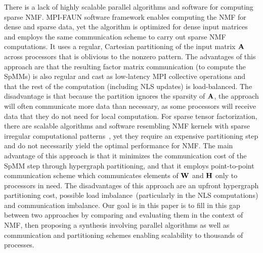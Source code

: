 There is a lack of highly scalable parallel algorithms and software for computing sparse NMF.
MPI-FAUN \cite{KBP17} software framework enables computing the NMF for dense and sparse data, yet the algorithm is optimized for dense input matrices and employs the same communication scheme to carry out sparse NMF computations.
It uses a regular, Cartesian partitioning of the input matrix $\AA$ across processors that is oblivious to the nonzero pattern.
The advantages of this approach are that the resulting factor matrix communication (to compute the SpMMs) is also regular and cast as low-latency MPI collective operations and that the rest of the computation (including NLS updates) is load-balanced.
The disadvantage is that because the partition ignores the sparsity of $\AA$, the approach will often communicate more data than necessary, as some processors will receive data that they do not need for local computation.
For sparse tensor factorization, there are scalable algorithms and software resembling NMF kernels with sparse irregular computational patterns~\cite{KU15}, yet they require an expensive partitioning step and do not necessarily yield the optimal performance for NMF.
The main advantage of this approach is that it minimizes the communication cost of the SpMM step through hypergraph partitioning, and that it employs point-to-point communication scheme which communicates elements of $\WW$ and $\HH$ only to processors in need.
The disadvantages of this approach are an upfront hypergraph partitioning cost, possible load imbalance~(particularly in the NLS computations) and communication imbalance.
Our goal is in this paper is to fill in this gap between two approaches by comparing and evaluating them in the context of NMF, then proposing a synthesis involving parallel algorithms as well as communication and partitioning schemes enabling scalability to thousands of processes.


